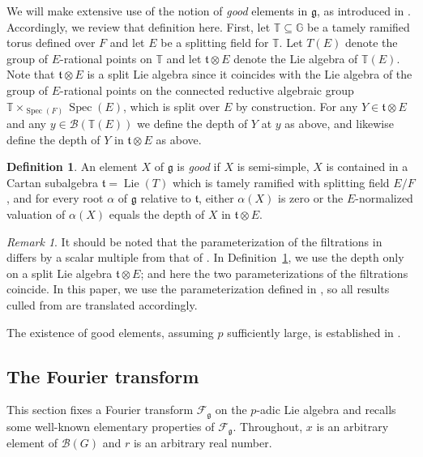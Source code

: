 \documentclass[11pt]{amsart}
\theoremstyle{definition}
\newtheorem{definition}[theorem]{Definition}
\theoremstyle{remark}
\newtheorem{remark}[theorem]{Remark}
\numberwithin{equation}{theorem}
\def\F{{F}}
\def\GF{{G}}
\def\TF{{T}}
\def\tF{{\mathfrak{t}}}
\def\gF{{\mathfrak{g}}}
\def\B{{\mathcal{B}}}
\def\Fourier{{\mathcal{F}}}
\def\Lie{{\operatorname{Lie}}}
\newcommand{\G}{{\mathbb{G}}}
\newcommand{\T}{{\mathbb{T}}}
\begin{document}
We will make extensive use of the notion of {\em good} elements in
$\gF$, as introduced in \cite[2.2.4]{Adler}.  Accordingly, we
review that definition here. First, let $\T\subseteq\G$ be a
tamely ramified torus defined over $\F$ and let $E$ be a splitting
field for $\T$. Let $\TF(E)$ denote the group of $E$-rational
points on $\T$ and let $\tF\otimes E$ denote the Lie algebra of
$\T(E)$. Note that $\tF\otimes E$ is a split Lie algebra since it
coincides with the Lie algebra of the group of $E$-rational points
on the connected reductive algebraic group $\T
\times_{\operatorname{Spec}(F)} \operatorname{Spec}(E)$, which is
split over $E$ by construction. For any $Y \in \tF\otimes E$ and
any $y\in \B(\T(E))$ we define the depth of $Y$ at $y$ as above,
and likewise define the depth of $Y$ in $\tF\otimes E$ as above.

\begin{definition}\label{definition: good}
An element $X$ of $\gF$ is {\em good} if $X$ is semi-simple, $X$
is contained in a Cartan subalgebra $\tF = \Lie(\TF)$ which is
tamely ramified with splitting field $E/F$, and for every root
$\alpha$ of $\gF$ relative to $\tF$, either $\alpha(X)$ is zero or
the $E$-normalized valuation of $\alpha(X)$ equals the depth of
$X$ in $\tF\otimes E$.
\end{definition}

\begin{remark}\label{remark: good}
It should be noted that the parameterization of the filtrations in
\cite{Adler} differs by a scalar multiple from that of
\cite{Moy-Prasad}. In Definition~\ref{definition: good}, we use
the depth only on a split Lie algebra $\tF\otimes E$; and here the
two parameterizations of the filtrations coincide. In this paper,
we use the parameterization defined in \cite{Moy-Prasad}, so all
results culled from \cite{Adler} are translated accordingly.
\end{remark}

The existence of good elements, assuming $p$ sufficiently large,
is established in \cite{A}.



\subsection{The Fourier transform}\label{section: Fourier transform}

This section fixes a Fourier transform $\Fourier_\gF$ on the
$p$-adic Lie algebra and recalls some well-known elementary
properties of $\Fourier_\gF$. Throughout, $x$ is an arbitrary
element of $\B(\GF)$ and $r$ is an arbitrary real number.
\end{document}
